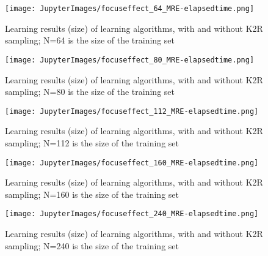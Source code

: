 \begin{figure}
\texttt{[image: JupyterImages/focuseffect\_64\_MRE-elapsedtime.png]}\caption{\label{tab:accuracy-mlalgos-matrix-time64} Learning results (size) of learning algorithms, with and without K2R sampling; N=64 is the size of the training set}\end{figure}\begin{figure}\centering
\texttt{[image: JupyterImages/focuseffect\_80\_MRE-elapsedtime.png]}\caption{\label{tab:accuracy-mlalgos-matrix-time80} Learning results (size) of learning algorithms, with and without K2R sampling; N=80 is the size of the training set}\end{figure}\begin{figure}\centering
\texttt{[image: JupyterImages/focuseffect\_112\_MRE-elapsedtime.png]}\caption{\label{tab:accuracy-mlalgos-matrix-time112} Learning results (size) of learning algorithms, with and without K2R sampling; N=112 is the size of the training set}\end{figure}\begin{figure}\centering
\texttt{[image: JupyterImages/focuseffect\_160\_MRE-elapsedtime.png]}\caption{\label{tab:accuracy-mlalgos-matrix-time160} Learning results (size) of learning algorithms, with and without K2R sampling; N=160 is the size of the training set}\end{figure}\begin{figure}\centering
\texttt{[image: JupyterImages/focuseffect\_240\_MRE-elapsedtime.png]}\caption{\label{tab:accuracy-mlalgos-matrix-time240} Learning results (size) of learning algorithms, with and without K2R sampling; N=240 is the size of the training set}\end{figure}